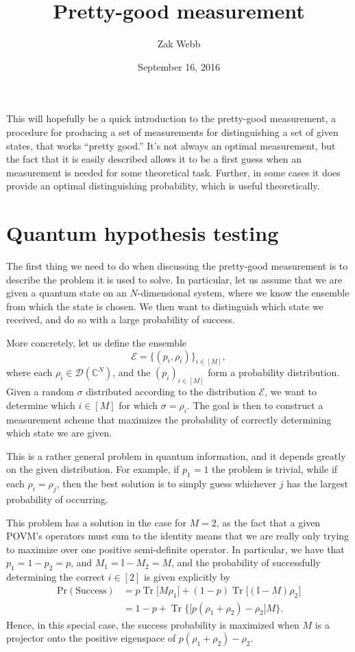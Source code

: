\documentclass{amsart}
\title{Pretty-good measurement}
\author{Zak Webb}
\date{September 16, 2016}
\theoremstyle{plain}
\theoremstyle{remark}
\newcommand{\CC}{\mathbb{C}}
\newcommand{\II}{\mathbb{I}}
\newcommand{\EE}{\mathcal{E}}
\DeclareMathOperator{\tr}{Tr}
\begin{document}
\maketitle 

This will hopefully be a quick introduction to the pretty-good measurement, a procedure for producing a set of measurements for distinguishing a set of given states, that works ``pretty good.''  It's not always an optimal measurement, but the fact that it is easily described allows it to be a first guess when an measurement is needed for some theoretical task.  Further, in some cases it does provide an optimal distinguishing probability, which is useful theoretically.

\section{Quantum hypothesis testing}

The first thing we need to do when discussing the pretty-good measurement is to describe the problem it is used to solve.  In particular, let us assume that we are given a quantum state on an $N$-dimensional system, where we know the ensemble from which the state is chosen.  We then want to distinguish which state we received, and do so with a large probability of success.

More concretely, let us define the ensemble
\begin{equation}
  \EE = \big\{ (p_i,\rho_i)\big\}_{i\in[M]},
\end{equation}
where each $\rho_i\in \mathcal{D}(\CC^N)$, and the $(p_i)_{i\in[M]}$ form a probability distribution.  Given a random $\sigma$ distributed according to the distribution $\EE$, we want to determine which $i\in[M]$ for which $\sigma = \rho_i$.  The goal is then to construct a measurement scheme that maximizes the probability of correctly determining which state we are given.

This is a rather general problem in quantum information, and it depends greatly on the given distribution.  For example, if $p_1 = 1$ the problem is trivial, while if each $\rho_i=\rho_j$, then the best solution is to simply guess whichever $j$ has the largest probability of occurring.

This problem has a solution in the case for $M=2$, as the fact that a given POVM's operators must sum to the identity means that we are really only trying to maximize over one positive semi-definite operator.  In particular, we have that $p_1 = 1-p_2 = p$, and $M_1 = \II - M_2 = M$, and the probability of successfully determining the correct $i\in[2]$ is given explicitly by
\begin{align}
  \text{Pr}(\text{Success}) &= p \tr\big[ M \rho_1\big] + (1-p) \tr \big[ (\II- M) \rho_2\big]\\
    &= 1-p + \tr\Big\{ \big[p (\rho_1 + \rho_2)- \rho_2\big] M  \Big\}.
\end{align}
Hence, in this special case, the success probability is maximized when $M$ is a projector onto the positive eigenspace of $p(\rho_1+\rho_2) - \rho_2$.
\end{document}
